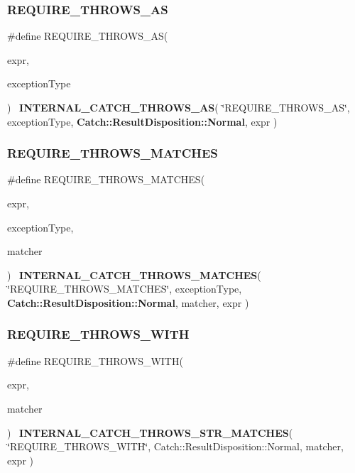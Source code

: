 \mbox{\label{catch_8hpp_ae24a059e3c28ff3eea69be48282f5f81}} 
\subsubsection{REQUIRE\_THROWS\_AS}
{\footnotesize\ttfamily \#define R\+E\+Q\+U\+I\+R\+E\+\_\+\+T\+H\+R\+O\+W\+S\+\_\+\+AS(\begin{DoxyParamCaption}\item[{}]{expr,  }\item[{}]{exception\+Type }\end{DoxyParamCaption})~\textbf{ I\+N\+T\+E\+R\+N\+A\+L\+\_\+\+C\+A\+T\+C\+H\+\_\+\+T\+H\+R\+O\+W\+S\+\_\+\+AS}( \char`\"{}R\+E\+Q\+U\+I\+R\+E\+\_\+\+T\+H\+R\+O\+W\+S\+\_\+\+AS\char`\"{}, exception\+Type, \textbf{ Catch\+::\+Result\+Disposition\+::\+Normal}, expr )}

\mbox{\label{catch_8hpp_a54473a48ac2ac55bfe1165b69e1b8010}} 
\subsubsection{REQUIRE\_THROWS\_MATCHES}
{\footnotesize\ttfamily \#define R\+E\+Q\+U\+I\+R\+E\+\_\+\+T\+H\+R\+O\+W\+S\+\_\+\+M\+A\+T\+C\+H\+ES(\begin{DoxyParamCaption}\item[{}]{expr,  }\item[{}]{exception\+Type,  }\item[{}]{matcher }\end{DoxyParamCaption})~\textbf{ I\+N\+T\+E\+R\+N\+A\+L\+\_\+\+C\+A\+T\+C\+H\+\_\+\+T\+H\+R\+O\+W\+S\+\_\+\+M\+A\+T\+C\+H\+ES}( \char`\"{}R\+E\+Q\+U\+I\+R\+E\+\_\+\+T\+H\+R\+O\+W\+S\+\_\+\+M\+A\+T\+C\+H\+ES\char`\"{}, exception\+Type, \textbf{ Catch\+::\+Result\+Disposition\+::\+Normal}, matcher, expr )}

\mbox{\label{catch_8hpp_aa39a017db507132071d2819f087b2f28}} 
\subsubsection{REQUIRE\_THROWS\_WITH}
{\footnotesize\ttfamily \#define R\+E\+Q\+U\+I\+R\+E\+\_\+\+T\+H\+R\+O\+W\+S\+\_\+\+W\+I\+TH(\begin{DoxyParamCaption}\item[{}]{expr,  }\item[{}]{matcher }\end{DoxyParamCaption})~\textbf{ I\+N\+T\+E\+R\+N\+A\+L\+\_\+\+C\+A\+T\+C\+H\+\_\+\+T\+H\+R\+O\+W\+S\+\_\+\+S\+T\+R\+\_\+\+M\+A\+T\+C\+H\+ES}( \char`\"{}R\+E\+Q\+U\+I\+R\+E\+\_\+\+T\+H\+R\+O\+W\+S\+\_\+\+W\+I\+TH\char`\"{}, Catch\+::\+Result\+Disposition\+::\+Normal, matcher, expr )}

